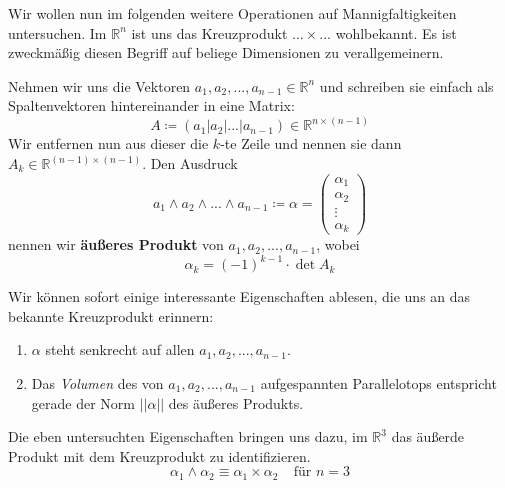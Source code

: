 Wir wollen nun im folgenden weitere Operationen auf Mannigfaltigkeiten untersuchen.
Im $\mathbb{R}^n$ ist uns das Kreuzprodukt $...\times...$ wohlbekannt.
Es ist zweckmäßig diesen Begriff auf beliege Dimensionen zu verallgemeinern.
\begin{definition}
Nehmen wir uns die Vektoren $a_1,a_2,...,a_{n-1}\in\mathbb{R}^n$ und schreiben sie einfach als Spaltenvektoren hintereinander in eine Matrix:
\begin{equation*}
A\coloneqq(a_1|a_2|...|a_{n-1})\in\mathbb{R}^{n\times(n-1)}
\end{equation*}
Wir entfernen nun aus dieser die $k$-te Zeile und nennen sie dann $A_k\in\mathbb{R}^{(n-1)\times(n-1)}$. 
Den Ausdruck
\begin{equation*}
a_1\wedge a_2\wedge...\wedge a_{n-1}\coloneqq\alpha=\begin{pmatrix}
\alpha_1 \\ \alpha_2 \\ \vdots \\ \alpha_k
\end{pmatrix}
\end{equation*}
nennen wir \textbf{äußeres Produkt} von $a_1,a_2,...,a_{n-1}$, wobei
\begin{equation*}
\alpha_k=(-1)^{k-1}\cdot\det A_k
\end{equation*}
\end{definition}
Wir können sofort einige interessante Eigenschaften ablesen, die uns an das bekannte Kreuzprodukt erinnern:
\begin{enumerate}
\item $\alpha$ steht senkrecht auf allen $a_1,a_2,...,a_{n-1}$.
\item Das \emph{Volumen} des von $a_1,a_2,...,a_{n-1}$ aufgespannten Parallelotops  entspricht gerade der Norm $||\alpha||$ des äußeres Produkts.
\end{enumerate}

\begin{beispiel}
Die eben untersuchten Eigenschaften bringen uns dazu, im $\mathbb{R}^3$ das äußerde Produkt mit dem Kreuzprodukt zu identifizieren.
\begin{equation*}
\alpha_1\wedge\alpha_2\equiv\alpha_1\times\alpha_2 \ \ \ \ \ \text{für\ } n=3
\end{equation*}
\end{beispiel}


